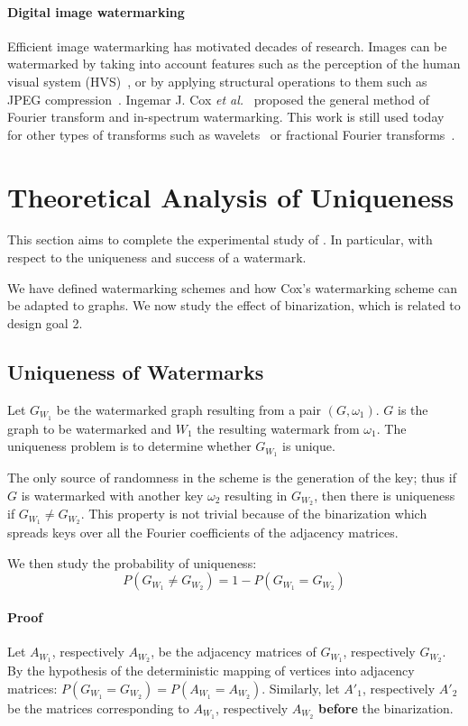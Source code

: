 \paragraph*{Digital image watermarking}
Efficient image watermarking has motivated decades of research. Images can be watermarked by taking into account features such as the perception of the human visual system (HVS)~\cite{HVS}, or by applying structural operations to them such as JPEG compression~\cite{JPEG}.
Ingemar J. Cox \textit{et al.}~\cite{TIP} proposed the general method of Fourier transform and in-spectrum watermarking. This work is still used today for other types of transforms such as wavelets~\cite{wvl} or fractional Fourier transforms~\cite{FFT}.

\section{Theoretical Analysis of Uniqueness}
\label{s:theory}
This section aims to complete the experimental study of \scheme. In particular, with respect to the uniqueness and success of a watermark.

We have defined watermarking schemes and how Cox's watermarking scheme can be adapted to graphs. We now study the effect of binarization, which is related to design goal 2.

\subsection{Uniqueness of Watermarks}

Let $G_{W_1}$ be the watermarked graph resulting from a pair $(G, \omega_1)$. $G$ is the graph to be watermarked and $W_1$ the resulting watermark from $\omega_1$. The uniqueness problem is to determine whether $G_{W_1}$ is unique. 

The only source of randomness in the scheme is the generation of the key; thus if $G$ is watermarked with another key $\omega_2$ resulting in $G_{W_2}$, then there is uniqueness if $G_{W_1} \neq G_{W_2}$. This property is not trivial because of the binarization which spreads keys over all the Fourier coefficients of the adjacency matrices.

We then study the probability of uniqueness:
\begin{equation}\label{result}
    P(G_{W_1} \neq G_{W_2}) = 1 - P(G_{W_1} = G_{W_2})
\end{equation}

\paragraph*{Proof}
    Let $A_{W_1}$, respectively $A_{W_2}$, be the adjacency matrices of $G_{W_1}$, respectively $G_{W_2}$. By the hypothesis of the deterministic mapping of vertices into adjacency matrices:
$P(G_{W_1} = G_{W_2}) = P(A_{W_1} = A_{W_2}).$
Similarly, let $A'_1$, respectively $A'_2$ be the matrices corresponding to $A_{W_1}$, respectively $A_{W_2}$ \textbf{before} the binarization.

